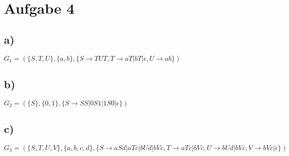 \section*{Aufgabe 4}

\subsection*{a)}
$G_1 = (\{S,T,U\},\{a,b\},\{S \rightarrow TUT,T \rightarrow aT|bT| \epsilon ,U \rightarrow ab\})      $


\subsection*{b)}
$G_2 = (\{S\},\{0,1\},\{S \rightarrow SS|0S1|1S0|\epsilon \})      $

\subsection*{c)}
$G_3 = (\{S,T,U,V\},\{a,b,c,d\},\{S \rightarrow aSd|aTc|bUd|bVc, T\rightarrow aTc|bVc,U\rightarrow bUd|bVc, V\rightarrow bVc|\epsilon \})      $